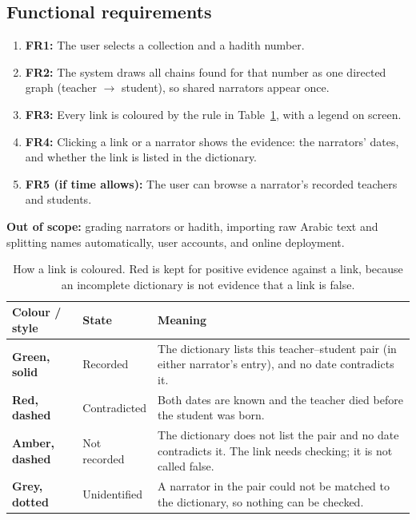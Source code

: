\documentclass[11pt,a4paper]{article}
\begin{document}
\subsection{Functional requirements}
\begin{enumerate}
    \item \textbf{FR1:} The user selects a collection and a hadith number.
    \item \textbf{FR2:} The system draws all chains found for that number as one directed graph (teacher $\rightarrow$ student), so shared narrators appear once.
    \item \textbf{FR3:} Every link is coloured by the rule in Table~\ref{tab:colours}, with a legend on screen.
    \item \textbf{FR4:} Clicking a link or a narrator shows the evidence: the narrators' dates, and whether the link is listed in the dictionary.
    \item \textbf{FR5 (if time allows):} The user can browse a narrator's recorded teachers and students.
\end{enumerate}
\textbf{Out of scope:} grading narrators or hadith, importing raw Arabic text and splitting names automatically, user accounts, and online deployment.

\begin{table}[H]
\centering
\small
\begin{tabularx}{\textwidth}{@{}p{2.5cm}p{2.9cm}X@{}}
\toprule
\textbf{Colour / style} & \textbf{State} & \textbf{Meaning}\\
\midrule
\textcolor{sage}{\textbf{Green, solid}} & Recorded & The dictionary lists this teacher--student pair (in either narrator's entry), and no date contradicts it.\\
\textcolor{terra}{\textbf{Red, dashed}} & Contradicted & Both dates are known and the teacher died before the student was born.\\
\textcolor{amberc}{\textbf{Amber, dashed}} & Not recorded & The dictionary does not list the pair and no date contradicts it. The link needs checking; it is not called false.\\
\textcolor{greyc}{\textbf{Grey, dotted}} & Unidentified & A narrator in the pair could not be matched to the dictionary, so nothing can be checked.\\
\bottomrule
\end{tabularx}
\caption{How a link is coloured. Red is kept for positive evidence against a link, because an incomplete dictionary is not evidence that a link is false.}
\label{tab:colours}
\end{table}
\end{document}
